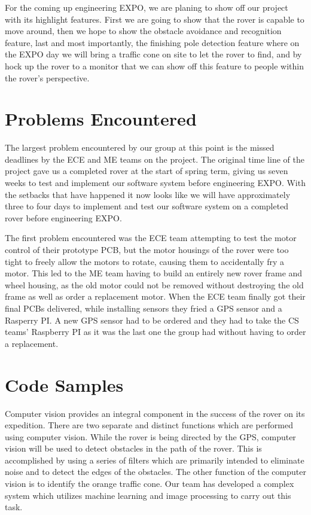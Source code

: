 \documentclass[10pt,letterpaper,onecolumn,draftclsnofoot,journal]{IEEEtran}
\begin{document}
\par
For the coming up engineering EXPO, we are planing to show off our project with its highlight features. First we are going to show that the rover is capable to move around, then we hope to show the obstacle avoidance and recognition feature, last and most importantly, the finishing pole detection feature where on the EXPO day we will bring a traffic cone on site to let the rover to find, and by hock up the rover to a monitor that we can show off this feature to people within the rover's perspective. 

\section{\textbf{Problems Encountered}}
The largest problem encountered by our group at this point is the missed deadlines by the ECE and ME teams on the project. The original time line of the project gave us a completed rover at the start of spring term, giving us seven weeks to test and implement our software system before engineering EXPO. With the setbacks that have happened it now looks like we will have approximately three to four days to implement and test our software system on a completed rover before engineering EXPO.\vspace{.3cm}
\par 
The first problem encountered was the ECE team attempting to test the motor control of their prototype PCB, but the motor housings of the rover were too tight to freely allow the motors to rotate, causing them to accidentally fry a motor. This led to the ME team having to build an entirely new rover frame and wheel housing, as the old motor could not be removed without destroying the old frame as well as order a replacement motor. When the ECE team finally got their final PCBs delivered, while installing sensors they fried a GPS sensor and a Rasperry PI. A new GPS sensor had to be ordered and they had to take the CS teams' Raspberry PI as it was the last one the group had without having to order a replacement.


\section{\textbf{Code Samples}}
Computer vision provides an integral component in the success of the rover on its expedition. There are two separate and distinct functions which are performed using computer vision. While the rover is being directed by the GPS, computer vision will be used to detect obstacles in the path of the rover. This is accomplished by using a series of filters which are primarily intended to eliminate noise and to detect the edges of the obstacles. The other function of the computer vision is to identify the orange traffic cone. Our team has developed a complex system which utilizes machine learning and image processing to carry out this task.\vspace{.3cm}
\par
\end{document}

